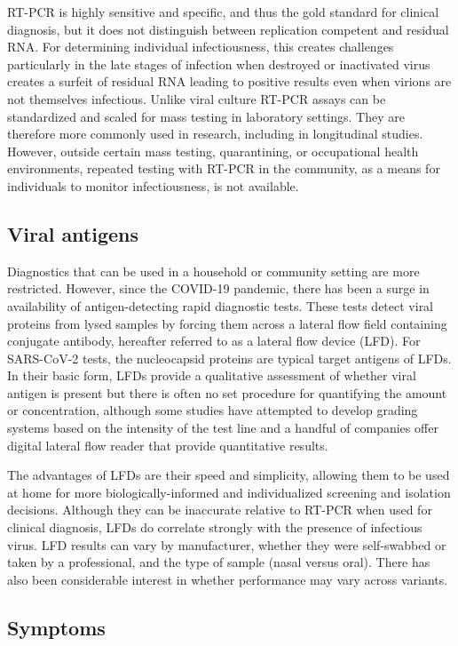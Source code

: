 \documentclass[12pt]{article}
\begin{document}
RT-PCR is highly sensitive and specific, and thus the gold standard for clinical diagnosis, but it does not distinguish between replication competent and residual RNA. For determining individual infectiousness, this creates challenges particularly in the late stages of infection when destroyed or inactivated virus creates a surfeit of residual RNA leading to positive results even when virions are not themselves infectious. Unlike viral culture RT-PCR assays can be standardized and scaled for mass testing in laboratory settings. They are therefore more commonly used in research, including in longitudinal studies. However, outside certain mass testing, quarantining, or occupational health environments, repeated testing with RT-PCR in the community, as a means for individuals to monitor infectiousness, is not available.

\subsection{Viral antigens}
Diagnostics that can be used in a household or community setting are more restricted. However, since the COVID-19 pandemic, there has been a surge in availability of antigen-detecting rapid diagnostic tests. These tests detect viral proteins from lysed samples by forcing them across a lateral flow field containing conjugate antibody, hereafter referred to as a lateral flow device (LFD). For SARS-CoV-2 tests, the nucleocapsid proteins are typical target antigens of LFDs. In their basic form, LFDs provide a qualitative assessment of whether viral antigen is present but there is often no set procedure for quantifying the amount or concentration, although some studies have attempted to develop grading systems based on the intensity of the test line and a handful of companies offer digital lateral flow reader that provide quantitative results. 

The advantages of LFDs are their speed and simplicity, allowing them to be used at home for more biologically-informed and individualized screening and isolation decisions. Although they can be inaccurate relative to RT-PCR when used for clinical diagnosis, LFDs do correlate strongly with the presence of infectious virus. LFD results can vary by manufacturer, whether they were self-swabbed or taken by a professional, and the type of sample (nasal versus oral). There has also been considerable interest in whether performance may vary across variants. 

\subsection{Symptoms}
\end{document}
